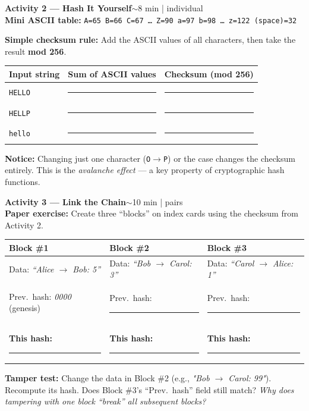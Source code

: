 \documentclass[11pt,a4paper]{article}
\newcommand{\activitybox}[3]{%
  \noindent\colorbox{mllavender4}{\parbox{\dimexpr\linewidth-2\fboxsep}{%
    \textbf{\color{mlpurple}#1}\hfill\textcolor{mlgray}{\small #2}\\[2pt]#3%
  }}\par\vspace{4pt}%
}
\newcommand{\fillcell}{\rule{2.2cm}{0.3pt}}
\begin{document}
\activitybox{Activity 2 — Hash It Yourself}{$\sim$8 min | individual}{%
\textbf{Mini ASCII table:}
\texttt{A=65 B=66 C=67 \ldots{} Z=90 \quad a=97 b=98 \ldots{} z=122 \quad (space)=32}

\textbf{Simple checksum rule:} Add the ASCII values of all characters, then take the result \textbf{mod 256}.

\vspace{4pt}
\begin{center}
\renewcommand{\arraystretch}{1.4}
\begin{tabular}{|l|c|c|}
\hline
\textbf{Input string} & \textbf{Sum of ASCII values} & \textbf{Checksum (mod 256)} \\
\hline
\texttt{HELLO} & \fillcell & \fillcell \\
\hline
\texttt{HELLP} & \fillcell & \fillcell \\
\hline
\texttt{hello} & \fillcell & \fillcell \\
\hline
\end{tabular}
\end{center}

\vspace{3pt}
\textbf{Notice:} Changing just one character (\texttt{O}$\to$\texttt{P}) or the case changes the checksum entirely.
This is the \emph{avalanche effect} — a key property of cryptographic hash functions.
}

\activitybox{Activity 3 — Link the Chain}{$\sim$10 min | pairs}{%
\textbf{Paper exercise:} Create three ``blocks'' on index cards using the checksum from Activity 2.

\vspace{3pt}
\begin{center}
\renewcommand{\arraystretch}{1.3}
\begin{tabular}{|p{3.2cm}|p{3.2cm}|p{3.2cm}|}
\hline
\textbf{Block \#1} & \textbf{Block \#2} & \textbf{Block \#3} \\
\hline
Data: \textit{``Alice $\to$ Bob: 5''} & Data: \textit{``Bob $\to$ Carol: 3''} & Data: \textit{``Carol $\to$ Alice: 1''} \\[4pt]
Prev.\ hash: \textit{0000} (genesis) & Prev.\ hash: \rule{1.8cm}{0.3pt} & Prev.\ hash: \rule{1.8cm}{0.3pt} \\[4pt]
\textbf{This hash:} \rule{1.8cm}{0.3pt} & \textbf{This hash:} \rule{1.8cm}{0.3pt} & \textbf{This hash:} \rule{1.8cm}{0.3pt} \\
\hline
\end{tabular}
\end{center}

\vspace{3pt}
\textbf{Tamper test:} Change the data in Block \#2 (e.g., \textit{"Bob $\to$ Carol: 99"}).
Recompute its hash. Does Block \#3's ``Prev.\ hash'' field still match?
\textit{Why does tampering with one block ``break'' all subsequent blocks?}
}
\end{document}
